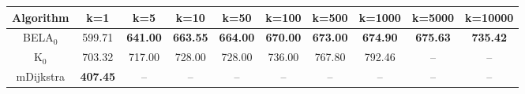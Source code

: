 \begin{tabular}{c|ccccccccc}\toprule
Algorithm & k=1 & k=5 & k=10 & k=50 & k=100 & k=500 & k=1000 & k=5000 & k=10000 \\ \midrule
BELA$_0$ & 599.71 & \textbf{641.00} & \textbf{663.55} & \textbf{664.00} & \textbf{670.00} & \textbf{673.00} & \textbf{674.90} & \textbf{675.63} & \textbf{735.42} \\
K$_0$ & 703.32 & 717.00 & 728.00 & 728.00 & 736.00 & 767.80 & 792.46 & -- & -- \\
mDijkstra & \textbf{407.45} & -- & -- & -- & -- & -- & -- & -- & -- \\ \bottomrule 
\end{tabular}
